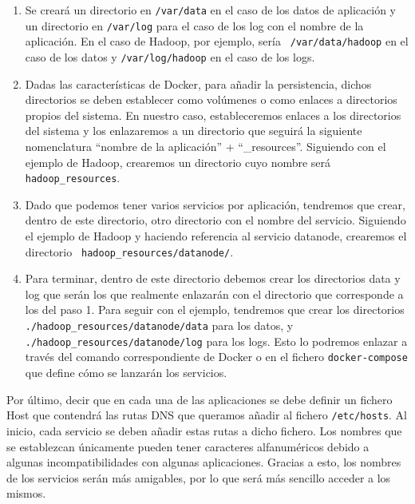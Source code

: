 \begin{enumerate}

\item Se creará un directorio en {\tt /var/data} en el caso de los datos de
  aplicación y un directorio en {\tt /var/log} para el caso de los log con
  el nombre de la aplicación. En el caso de Hadoop, por ejemplo, sería {\tt
    /var/data/hadoop} en el caso de los datos y {\tt /var/log/hadoop} en el
  caso de los logs.

\item Dadas las características de Docker, para añadir la persistencia,
  dichos directorios se deben establecer como volúmenes o como enlaces a
  directorios propios del sistema. En nuestro caso, estableceremos enlaces
  a los directorios del sistema y los enlazaremos a un directorio que
  seguirá la siguiente nomenclatura ``nombre de la aplicación'' +
  ``\_resources''. Siguiendo con el ejemplo de Hadoop, crearemos un
  directorio cuyo nombre será {\tt hadoop\_resources}.

\item Dado que podemos tener varios servicios por aplicación, tendremos que
  crear, dentro de este directorio, otro directorio con el nombre del
  servicio. Siguiendo el ejemplo de Hadoop y haciendo referencia al
  servicio datanode, crearemos el directorio {\tt
    hadoop\_resources/datanode/}.

\item Para terminar, dentro de este directorio debemos crear los
  directorios data y log que serán los que realmente enlazarán con el
  directorio que corresponde a los del paso 1. Para seguir con el ejemplo,
  tendremos que crear los directorios {\tt
    ./hadoop\_resources/datanode/data} para los datos, y {\tt
    ./hadoop\_resources/datanode/log} para los logs. Esto lo podremos
  enlazar a través del comando correspondiente de Docker o en el fichero
  {\tt docker-compose} que define cómo se lanzarán los servicios.

\end{enumerate}

Por último, decir que en cada una de las aplicaciones se debe definir un
fichero Host que contendrá las rutas DNS que queramos añadir al fichero
{\tt /etc/hosts}. Al inicio, cada servicio se deben añadir estas rutas a
dicho fichero. Los nombres que se establezcan únicamente pueden tener
caracteres alfanuméricos debido a algunas incompatibilidades con algunas
aplicaciones. Gracias a esto, los nombres de los servicios serán más
amigables, por lo que será más sencillo acceder a los mismos.

